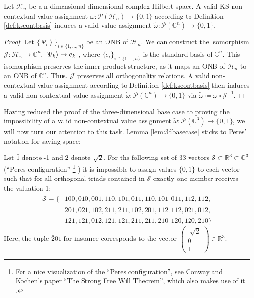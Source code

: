 \begin{lemma}
Let $\mathcal{H}_{n}$ be a n-dimensional dimensional complex Hilbert space. A valid KS non-contextual value assignment $\omega:\mathcal{P}(\mathcal{H}_{n})\rightarrow\{0,1\}$ according to Definition \ref{def:kscontbasis} induces a valid value assignment $\tilde{\omega}:\mathcal{P}(\mathbb{C}^{n})\rightarrow\{0,1\}$.
\end{lemma}

\begin{proof}
Let $\{\left|\Psi_{i}\right\rangle \}_{i\in\{1,\dots,n\}}$ be an ONB of $\mathcal{H}_{n}$. We can construct the isomorphism $\mathcal{J}:\mathcal{\mathcal{H}}_{n}\rightarrow\mathbb{C}^{n}$, $\ket{\Psi_{k}} \mapsto e_{k}$ , where $\{e_{i}\}_{i\in\{1,\dots,n\}}$ is the standard basis of $\mathbb{C}^{n}$. This isomorphism preserves the inner product structure, as it maps an ONB of $\mathcal{H}_{n}$ to an ONB of $\mathbb{C}^{n}$. Thus, $\mathcal{J}$ preserves all orthogonality relations. A valid non-contextual value assignment according to Definition \ref{def:kscontbasis} then induces a valid non-contextual value assignment $\tilde{\omega}:\mathcal{P}(\mathbb{C}^{n})\rightarrow\{0,1\}$ via $\tilde{\omega}\coloneqq\omega\circ\mathcal{J}^{-1}$.
\end{proof}

Having reduced the proof of the three-dimensional base case to proving the impossibility of a valid non-contextual value assignment $\tilde{\omega}:\mathcal{P}(\mathbb{C}^{3})\rightarrow\{0,1\}$, we will now turn our attention to this task. Lemma \ref{lem:3dbasecase} sticks to Peres' notation \cite{Peres1991} for saving space:

\begin{lemma}
\label{lem:3dbasecase}
Let $\bar{1}$ denote -1 and 2 denote $\sqrt{2}$. For the following set of 33 vectors $\mathcal{S}\subset\mathbb{R}^{3}\subset\mathbb{C}^{3}$ (“Peres configuration” \footnote{For a nice visualization of the “Peres configuration”, see Conway and Kochen's paper “The Strong Free Will Theorem”, which also makes use of it \cite{Conway2011}.} \cite{Peres1991}) it is impossible to assign values $\{0,1\}$ to each vector such that for all orthogonal triads contained in $\mathcal{S}$ exactly one member receives the valuation 1:
\begin{equation*}
\begin{split}
\mathcal{S}= \{ & 100,010,001,110,101,011,1\bar{1}0,\bar{1}01,0\bar{1}1,1\bar{1}2,\bar{1}12, \\
& \bar{2}01,021,102,\bar{2}11,211,\bar{1}02,201,\bar{1}\bar{1}2,112,0\bar{2}1,012, \\
& 1\bar{2}1,121,0\bar{1}2,12\bar{1},\bar{1}21,21\bar{1},2\bar{1}1,\bar{2}10,1\bar{2}0,120,210\} 
\end{split}
\end{equation*}
Here, the tuple $\bar{2}01$ for instance corresponds to the vector 
$\begin{pmatrix}
\text{-}\sqrt{2}\\
0\\
1
\end{pmatrix}\in\mathbb{R}^{3}.$
\end{lemma}


